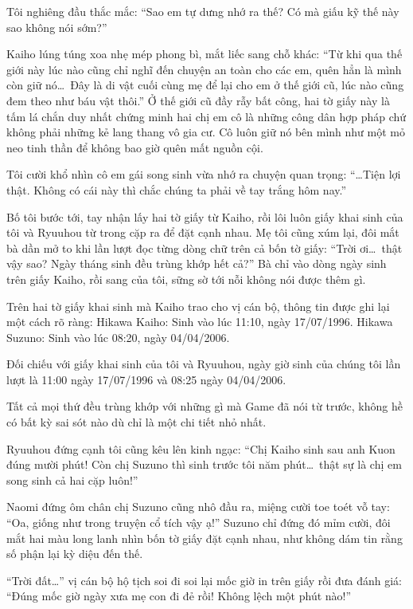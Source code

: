 ﻿\documentclass[../main.tex]{subfiles}
\begin{document}
Tôi nghiêng đầu thắc mắc: ``Sao em tự dưng nhớ ra thế? Có mà giấu kỹ thế này sao không nói sớm?''

Kaiho lúng túng xoa nhẹ mép phong bì, mắt liếc sang chỗ khác: ``Từ khi qua thế giới này lúc nào cũng chỉ nghĩ đến chuyện an toàn cho các em, quên hẳn là mình còn giữ nó\dots\ Đây là di vật cuối cùng mẹ để lại cho em ở thế giới cũ, lúc nào cũng đem theo như báu vật thôi.'' Ở thế giới cũ đầy rẫy bất công, hai tờ giấy này là tấm lá chắn duy nhất chứng minh hai chị em cô là những công dân hợp pháp chứ không phải những kẻ lang thang vô gia cư. Cô luôn giữ nó bên mình như một mỏ neo tinh thần để không bao giờ quên mất nguồn cội.

Tôi cười khổ nhìn cô em gái song sinh vừa nhớ ra chuyện quan trọng: ``\dots Tiện lợi thật. Không có cái này thì chắc chúng ta phải về tay trắng hôm nay.''

Bố tôi bước tới, tay nhận lấy hai tờ giấy từ Kaiho, rồi lôi luôn giấy khai sinh của tôi và Ryuuhou từ trong cặp ra để đặt cạnh nhau. Mẹ tôi cũng xúm lại, đôi mắt bà dần mở to khi lần lượt đọc từng dòng chữ trên cả bốn tờ giấy: ``Trời ơi\dots\ thật vậy sao? Ngày tháng sinh đều trùng khớp hết cả?'' Bà chỉ vào dòng ngày sinh trên giấy Kaiho, rồi sang của tôi, sững sờ tới nỗi không nói được thêm gì.

Trên hai tờ giấy khai sinh mà Kaiho trao cho vị cán bộ, thông tin được ghi lại một cách rõ ràng: Hikawa Kaiho: Sinh vào lúc 11:10, ngày 17/07/1996. Hikawa Suzuno: Sinh vào lúc 08:20, ngày 04/04/2006.

Đối chiếu với giấy khai sinh của tôi và Ryuuhou, ngày giờ sinh của chúng tôi lần lượt là 11:00 ngày 17/07/1996 và 08:25 ngày 04/04/2006.

Tất cả mọi thứ đều trùng khớp với những gì mà Game đã nói từ trước, không hề có bất kỳ sai sót nào dù chỉ là một chi tiết nhỏ nhất.

Ryuuhou đứng cạnh tôi cũng kêu lên kinh ngạc: ``Chị Kaiho sinh sau anh Kuon đúng mười phút! Còn chị Suzuno thì sinh trước tôi năm phút\dots\ thật sự là chị em song sinh cả hai cặp luôn!''

Naomi đứng ôm chân chị Suzuno cũng nhô đầu ra, miệng cười toe toét vỗ tay: ``Oa, giống như trong truyện cổ tích vậy ạ!'' Suzuno chỉ đứng đó mỉm cười, đôi mắt hai màu long lanh nhìn bốn tờ giấy đặt cạnh nhau, như không dám tin rằng số phận lại kỳ diệu đến thế.

``Trời đất\dots'' vị cán bộ hộ tịch soi đi soi lại mốc giờ in trên giấy rồi đưa đánh giá: ``Đúng mốc giờ ngày xưa mẹ con đi đẻ rồi! Không lệch một phút nào!''
\end{document}
